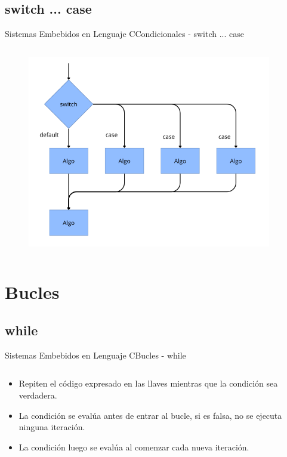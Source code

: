 \documentclass[aspectratio=169, xcolor=dvipsnames]{beamer}
\begin{document}
\subsection{switch ... case}
\begin{frame}{Sistemas Embebidos en Lenguaje C}{Condicionales - switch ... case}
\begin{columns}
    \begin{column}{0.6\textwidth}
        \begin{figure}
            \centering
            \includegraphics[width=0.8\linewidth]{resources/images/switch_case.png}
        \end{figure}
    \end{column}
    \begin{column}{0.4\textwidth}
        
    \end{column}
\end{columns}
\end{frame}

\section{Bucles}
\subsection{while}
\begin{frame}{Sistemas Embebidos en Lenguaje C}{Bucles - while}
\begin{columns}
    \begin{column}{0.5\textwidth}
    \begin{itemize}
        \item Repiten el código expresado en las llaves mientras que la condición sea verdadera.
        \item La condición se evalúa antes de entrar al bucle, si es falsa, no se ejecuta ninguna iteración.
        \item La condición luego se evalúa al comenzar cada nueva iteración.
    \end{itemize}
    \end{column}
    \begin{column}{0.5\textwidth}
    
    \end{column}
\end{columns}
\end{frame}
\end{document}
